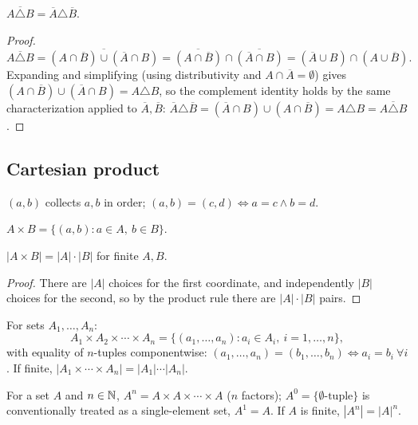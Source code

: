 \documentclass[11pt]{article}
\begin{document}
\begin{theorem}
$\overline{A \triangle B} = \overline{A} \triangle \overline{B}$.
\end{theorem}
\begin{proof}
\[
\overline{A \triangle B} = \overline{(A \cap \overline{B}) \cup (\overline{A} \cap B)} = \overline{(A \cap \overline{B})} \cap \overline{(\overline{A} \cap B)} = (\overline{A} \cup B) \cap (A \cup \overline{B}).
\]
Expanding and simplifying (using distributivity and $A \cap \overline{A} = \emptyset$) gives $(A \cap \overline{B}) \cup (\overline{A} \cap B) = A \triangle B$, so the complement identity holds by the same characterization applied to $\overline{A}, \overline{B}$: $\overline{A}\triangle\overline{B} = (\overline{A}\cap B)\cup(A\cap\overline{B}) = A \triangle B = \overline{A \triangle B}$.
\end{proof}

\subsection{Cartesian product}
\label{sec:1-14}
\begin{definition}
$(a,b)$ collects $a,b$ in order; $(a,b) = (c,d) \iff a=c \wedge b=d$.
\end{definition}

\begin{definition}
$A \times B = \{(a,b) : a \in A,\ b \in B\}$.
\end{definition}

\begin{theorem}
$|A \times B| = |A|\cdot|B|$ for finite $A,B$.
\end{theorem}
\begin{proof}
There are $|A|$ choices for the first coordinate, and independently $|B|$ choices for the second, so by the product rule there are $|A|\cdot|B|$ pairs.
\end{proof}

\begin{definition}
For sets $A_1,\dots,A_n$:
\[
A_1 \times A_2 \times \cdots \times A_n = \{(a_1,\dots,a_n) : a_i \in A_i,\ i=1,\dots,n\},
\]
with equality of $n$-tuples componentwise: $(a_1,\dots,a_n)=(b_1,\dots,b_n) \iff a_i=b_i\ \forall i$. If finite, $|A_1\times\cdots\times A_n| = |A_1|\cdots|A_n|$.
\end{definition}

\begin{definition}
For a set $A$ and $n \in \mathbb{N}$, $A^n = A \times A \times \cdots \times A$ ($n$ factors); $A^0 = \{\emptyset\text{-tuple}\}$ is conventionally treated as a single-element set, $A^1 = A$. If $A$ is finite, $|A^n| = |A|^n$.
\end{definition}
\end{document}
